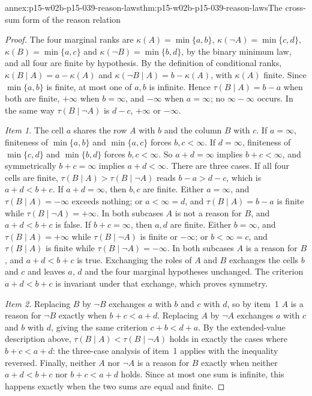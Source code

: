 \begin{annexitem}{annex:p15-w02b-p15-039-reason-laws}{thm:p15-w02b-p15-039-reason-laws}{The cross-sum form of the reason relation}
\begin{proof}
The four marginal ranks are \(\kappa(A)=\min\{a,b\}\),
\(\kappa(\neg A)=\min\{c,d\}\), \(\kappa(B)=\min\{a,c\}\) and
\(\kappa(\neg B)=\min\{b,d\}\), by the binary minimum law, and all four
are finite by hypothesis.  By the definition of conditional ranks,
\(\kappa(B\mid A)=a-\kappa(A)\) and \(\kappa(\neg B\mid A)=b-\kappa(A)\),
with \(\kappa(A)\) finite.  Since \(\min\{a,b\}\) is finite, at most one of
\(a,b\) is infinite.  Hence \(\tau(B\mid A)=b-a\) when both are finite,
\(+\infty\) when \(b=\infty\), and \(-\infty\) when \(a=\infty\); no
\(\infty-\infty\) occurs.  In the same way \(\tau(B\mid\neg A)\) is
\(d-c\), \(+\infty\) or \(-\infty\).

\emph{Item 1.}  The cell \(a\) shares the row \(A\) with \(b\) and the
column \(B\) with \(c\).  If \(a=\infty\), finiteness of \(\min\{a,b\}\)
and \(\min\{a,c\}\) forces \(b,c<\infty\).  If \(d=\infty\), finiteness
of \(\min\{c,d\}\) and \(\min\{b,d\}\) forces \(b,c<\infty\).  So
\(a+d=\infty\) implies \(b+c<\infty\), and symmetrically \(b+c=\infty\)
implies \(a+d<\infty\).  There are three cases.
If all four cells are finite, \(\tau(B\mid A)>\tau(B\mid\neg A)\) reads
\(b-a>d-c\), which is \(a+d<b+c\).
If \(a+d=\infty\), then \(b,c\) are finite.  Either \(a=\infty\), and
\(\tau(B\mid A)=-\infty\) exceeds nothing; or \(a<\infty=d\), and
\(\tau(B\mid A)=b-a\) is finite while \(\tau(B\mid\neg A)=+\infty\).  In
both subcases \(A\) is not a reason for \(B\), and \(a+d<b+c\) is false.
If \(b+c=\infty\), then \(a,d\) are finite.  Either \(b=\infty\), and
\(\tau(B\mid A)=+\infty\) while \(\tau(B\mid\neg A)\) is finite or
\(-\infty\); or \(b<\infty=c\), and \(\tau(B\mid A)\) is finite while
\(\tau(B\mid\neg A)=-\infty\).  In both subcases \(A\) is a reason for
\(B\), and \(a+d<b+c\) is true.
Exchanging the roles of \(A\) and \(B\) exchanges the cells \(b\) and
\(c\) and leaves \(a\), \(d\) and the four marginal hypotheses unchanged.
The criterion \(a+d<b+c\) is invariant under that exchange, which proves
symmetry.

\emph{Item 2.}  Replacing \(B\) by \(\neg B\) exchanges \(a\) with \(b\)
and \(c\) with \(d\), so by item~1 \(A\) is a reason for \(\neg B\)
exactly when \(b+c<a+d\).  Replacing \(A\) by \(\neg A\) exchanges \(a\)
with \(c\) and \(b\) with \(d\), giving the same criterion \(c+b<d+a\).
By the extended-value description above,
\(\tau(B\mid A)<\tau(B\mid\neg A)\) holds in exactly the cases where
\(b+c<a+d\): the three-case analysis of item~1 applies with the inequality
reversed.  Finally, neither \(A\) nor \(\neg A\) is a reason for \(B\)
exactly when neither \(a+d<b+c\) nor \(b+c<a+d\) holds.  Since at most one
sum is infinite, this happens exactly when the two sums are equal and finite.


\end{proof}
\end{annexitem}
